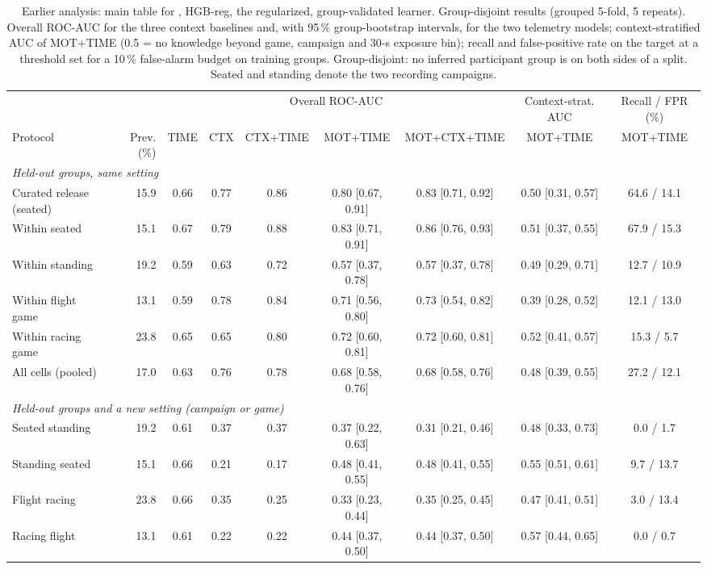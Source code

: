 \begin{table}[t]
\centering
\footnotesize
\caption{Earlier analysis: main table for \sevtwo{}, HGB-reg, the regularized, group-validated learner. Group-disjoint results (grouped 5-fold, 5 repeats). Overall ROC-AUC for the three context baselines and, with 95\,\% group-bootstrap intervals, for the two telemetry models; context-stratified AUC of MOT+TIME (0.5 = no knowledge beyond game, campaign and 30-s exposure bin); recall and false-positive rate on the target at a threshold set for a 10\,\% false-alarm budget on training groups. Group-disjoint: no inferred participant group is on both sides of a split. Seated and standing denote the two recording campaigns.}
\label{tab:supp_hgbr}
\footnotesize
\setlength{\tabcolsep}{2.4pt}
\begin{tabular}{lrccccccc}
\toprule
 & & \multicolumn{5}{c}{Overall ROC-AUC} & Context-strat. AUC & Recall / FPR (\%) \\
\cmidrule(lr){3-7}\cmidrule(lr){8-8}\cmidrule(lr){9-9}
Protocol & Prev. (\%) & TIME & CTX & CTX+TIME & MOT+TIME & MOT+CTX+TIME & MOT+TIME & MOT+TIME \\
\midrule
\multicolumn{9}{l}{\emph{Held-out groups, same setting}} \\
Curated release (seated) & 15.9 & 0.66 & 0.77 & 0.86 & 0.80 [0.67, 0.91] & 0.83 [0.71, 0.92] & 0.50 [0.31, 0.57] & 64.6 / 14.1 \\
Within seated & 15.1 & 0.67 & 0.79 & 0.88 & 0.83 [0.71, 0.91] & 0.86 [0.76, 0.93] & 0.51 [0.37, 0.55] & 67.9 / 15.3 \\
Within standing & 19.2 & 0.59 & 0.63 & 0.72 & 0.57 [0.37, 0.78] & 0.57 [0.37, 0.78] & 0.49 [0.29, 0.71] & 12.7 / 10.9 \\
Within flight game & 13.1 & 0.59 & 0.78 & 0.84 & 0.71 [0.56, 0.80] & 0.73 [0.54, 0.82] & 0.39 [0.28, 0.52] & 12.1 / 13.0 \\
Within racing game & 23.8 & 0.65 & 0.65 & 0.80 & 0.72 [0.60, 0.81] & 0.72 [0.60, 0.81] & 0.52 [0.41, 0.57] & 15.3 / 5.7 \\
All cells (pooled) & 17.0 & 0.63 & 0.76 & 0.78 & 0.68 [0.58, 0.76] & 0.68 [0.58, 0.76] & 0.48 [0.39, 0.55] & 27.2 / 12.1 \\
\multicolumn{9}{l}{\emph{Held-out groups and a new setting (campaign or game)}} \\
Seated \ra{} standing & 19.2 & 0.61 & 0.37 & 0.37 & 0.37 [0.22, 0.63] & 0.31 [0.21, 0.46] & 0.48 [0.33, 0.73] & 0.0 / 1.7 \\
Standing \ra{} seated & 15.1 & 0.66 & 0.21 & 0.17 & 0.48 [0.41, 0.55] & 0.48 [0.41, 0.55] & 0.55 [0.51, 0.61] & 9.7 / 13.7 \\
Flight \ra{} racing & 23.8 & 0.66 & 0.35 & 0.25 & 0.33 [0.23, 0.44] & 0.35 [0.25, 0.45] & 0.47 [0.41, 0.51] & 3.0 / 13.4 \\
Racing \ra{} flight & 13.1 & 0.61 & 0.22 & 0.22 & 0.44 [0.37, 0.50] & 0.44 [0.37, 0.50] & 0.57 [0.44, 0.65] & 0.0 / 0.7 \\
\bottomrule
\end{tabular}
\end{table}